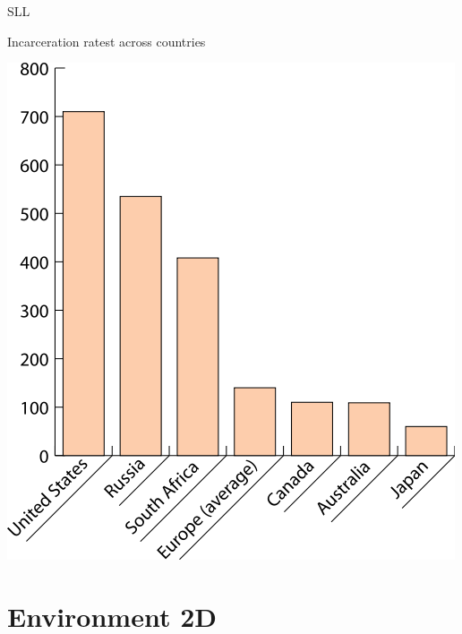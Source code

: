 \begin{chart}{S}{LL}
\caption{Incarceration ratest across countries}
\label{chart:incarceration}
\includegraphics[width=\chartwidth,height=\chartheight]{incarceration}  
\end{chart}


\section{Environment 2D}

\lipsum[1-2]

